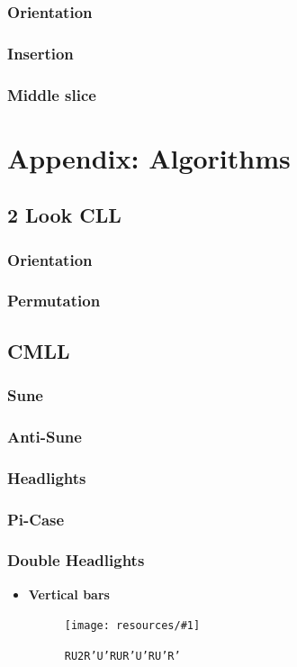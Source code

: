 \documentclass[a4paper]{scrreprt}
\newcommand{\img}[3]{
	\begin{figure}[ht]
	\centering
  \texttt{[image: resources/\#1]}
	\caption*{#3}
	\end{figure}
}
\begin{document}
\subsection{Orientation}
\subsection{Insertion}
\subsection{Middle slice}



\chapter{Appendix: Algorithms}

\section{2 Look CLL}
\subsection{Orientation}
\subsection{Permutation}

\section{CMLL}
\subsection{Sune}
\subsection{Anti-Sune}
\subsection{Headlights}
\subsection{Pi-Case}
\subsection{Double Headlights}
\begin{itemize}
\item
	\textbf{Vertical bars}\par
	\img{cmll/double_headlights/vertical.png}{0.5}{\texttt{RU2R'U'RUR'U'RU'R'}}
\end{itemize}
\end{document}
